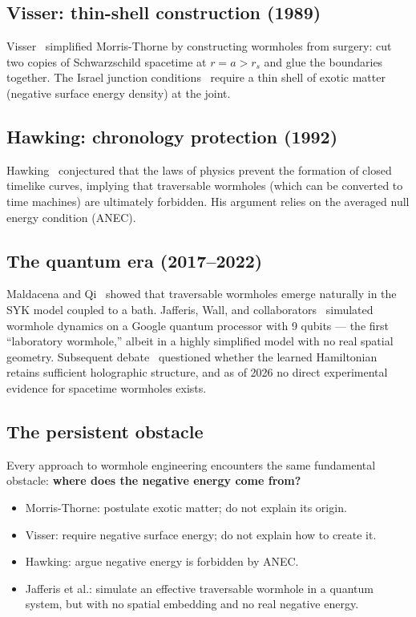 \documentclass[11pt,a4paper]{article}
\begin{document}
\subsection{Visser: thin-shell construction (1989)}

Visser~\cite{Visser1989} simplified Morris-Thorne by constructing
wormholes from surgery: cut two copies of Schwarzschild spacetime
at $r = a > r_s$ and glue the boundaries together. The Israel
junction conditions~\cite{Israel1966} require a thin shell of
exotic matter (negative surface energy density) at the joint.

\subsection{Hawking: chronology protection (1992)}

Hawking~\cite{Hawking1992} conjectured that the laws of physics
prevent the formation of closed timelike curves, implying that
traversable wormholes (which can be converted to time machines)
are ultimately forbidden. His argument relies on the averaged
null energy condition (ANEC).

\subsection{The quantum era (2017--2022)}

Maldacena and Qi~\cite{MaldacenaQi2018} showed that traversable
wormholes emerge naturally in the SYK model coupled to a bath.
Jafferis, Wall, and collaborators~\cite{Jafferis2022} simulated
wormhole dynamics on a Google quantum processor with 9 qubits ---
the first ``laboratory wormhole,'' albeit in a highly simplified
model with no real spatial geometry. Subsequent
debate~\cite{Kobrin2023} questioned whether the learned
Hamiltonian retains sufficient holographic structure, and
as of 2026 no direct experimental evidence for spacetime
wormholes exists.

\subsection{The persistent obstacle}

Every approach to wormhole engineering encounters the same
fundamental obstacle: \textbf{where does the negative energy
come from?}

\begin{itemize}
\item Morris-Thorne: postulate exotic matter; do not explain its origin.
\item Visser: require negative surface energy; do not explain how to create it.
\item Hawking: argue negative energy is forbidden by ANEC.
\item Jafferis et al.: simulate an effective traversable wormhole
  in a quantum system, but with no spatial embedding and no real
  negative energy.
\end{itemize}
\end{document}
